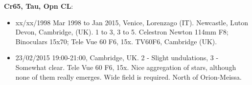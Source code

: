 {\bf Cr65, Tau, Opn CL}:
\begin{itemize}
\item xx/xx/1998 Mar 1998 to Jan 2015, Venice, Lorenzago (IT). Newcastle, Luton Devon, Cambridge, (UK). 1 to 3, 3 to 5. Celestron Newton 114mm F8; Binoculars 15x70; Tele Vue 60 F6, 15x. TV60F6, Cambridge (UK).
\item 23/02/2015 19:00-21:00, Cambridge, UK. 2 - Slight undulations, 3 - Somewhat clear. Tele Vue 60 F6, 15x. Nice aggregation of stars, although none of them really emerges. Wide field is required. North of Orion-Meissa.
\end{itemize}
